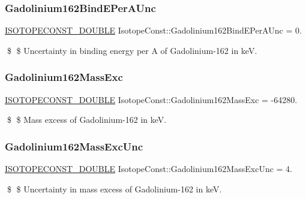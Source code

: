 \subsubsection{\texorpdfstring{Gadolinium162\+Bind\+E\+Per\+A\+Unc}{Gadolinium162BindEPerAUnc}}
{\footnotesize\ttfamily \mbox{\hyperlink{group___isotope_const-_macros_ga8f45a7272ce02c0b4c65c44636ed719a}{I\+S\+O\+T\+O\+P\+E\+C\+O\+N\+S\+T\+\_\+\+D\+O\+U\+B\+LE}} Isotope\+Const\+::\+Gadolinium162\+Bind\+E\+Per\+A\+Unc = 0.}

\$ \$ Uncertainty in binding energy per A of Gadolinium-\/162 in keV. \mbox{\label{group___isotope_const-_gadolinium-_gd162_ga85d42e8e80086b87c7d72398d49902a3}} 
\subsubsection{\texorpdfstring{Gadolinium162\+Mass\+Exc}{Gadolinium162MassExc}}
{\footnotesize\ttfamily \mbox{\hyperlink{group___isotope_const-_macros_ga8f45a7272ce02c0b4c65c44636ed719a}{I\+S\+O\+T\+O\+P\+E\+C\+O\+N\+S\+T\+\_\+\+D\+O\+U\+B\+LE}} Isotope\+Const\+::\+Gadolinium162\+Mass\+Exc = -\/64280.}

\$ \$ Mass excess of Gadolinium-\/162 in keV. \mbox{\label{group___isotope_const-_gadolinium-_gd162_ga5f124f2de9cb2ab428829c0f57de0c10}} 
\subsubsection{\texorpdfstring{Gadolinium162\+Mass\+Exc\+Unc}{Gadolinium162MassExcUnc}}
{\footnotesize\ttfamily \mbox{\hyperlink{group___isotope_const-_macros_ga8f45a7272ce02c0b4c65c44636ed719a}{I\+S\+O\+T\+O\+P\+E\+C\+O\+N\+S\+T\+\_\+\+D\+O\+U\+B\+LE}} Isotope\+Const\+::\+Gadolinium162\+Mass\+Exc\+Unc = 4.}

\$ \$ Uncertainty in mass excess of Gadolinium-\/162 in keV. \mbox{\label{group___isotope_const-_gadolinium-_gd162_ga7a15ac0dac40a16fde3d76afc3758288}} 
